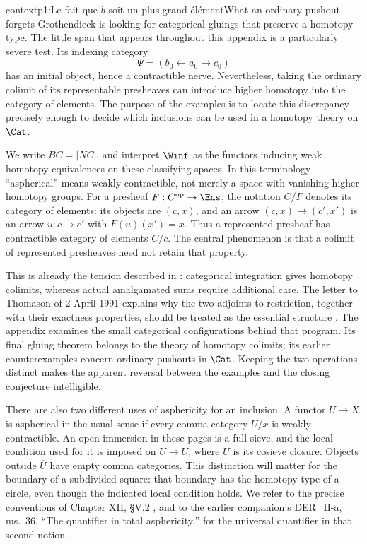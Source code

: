 \begin{dcomment}{context}{p1:Le fait que $b$ soit un plus grand élément}{What an ordinary pushout forgets}
Grothendieck is looking for categorical gluings that preserve a homotopy type. The little span that appears throughout this appendix is a particularly severe test. Its indexing category
\[
  \Psi=(b_0\longleftarrow a_0\longrightarrow c_0)
\]
has an initial object, hence a contractible nerve. Nevertheless, taking the ordinary colimit of its representable presheaves can introduce higher homotopy into the category of elements. The purpose of the examples is to locate this discrepancy precisely enough to decide which inclusions can be used in a homotopy theory on \(\Cat\).

We write \(BC=|NC|\), and interpret \(\Winf\) as the functors inducing weak homotopy equivalences on these classifying spaces. In this terminology ``aspherical'' means weakly contractible, not merely a space with vanishing higher homotopy groups. For a presheaf \(F:C^{\mathrm{op}}\to\Ens\), the notation \(C/F\) denotes its category of elements: its objects are \((c,x)\), and an arrow \((c,x)\to(c',x')\) is an arrow \(u:c\to c'\) with \(F(u)(x')=x\). Thus a represented presheaf has contractible category of elements \(C/c\). The central phenomenon is that a colimit of represented presheaves need not retain that property.

This is already the tension described in \citet[\S69]{Grothendieck1983}: categorical integration gives homotopy colimits, whereas actual amalgamated sums require additional care. The letter to Thomason of 2 April 1991 explains why the two adjoints to restriction, together with their exactness properties, should be treated as the essential structure \citep[pp.~8--9]{Grothendieck1991Letter}. The appendix examines the small categorical configurations behind that program. Its final gluing theorem belongs to the theory of homotopy colimits; its earlier counterexamples concern ordinary pushouts in \(\Cat\). Keeping the two operations distinct makes the apparent reversal between the examples and the closing conjecture intelligible.

There are also two different uses of asphericity for an inclusion. A functor \(U\to X\) is aspherical in the usual sense if every comma category \(U/x\) is weakly contractible. An open immersion in these pages is a full sieve, and the local condition used for it is imposed on \(U\to\overline U\), where \(\overline U\) is its cosieve closure. Objects outside \(\overline U\) have empty comma categories. This distinction will matter for the boundary of a subdivided square: that boundary has the homotopy type of a circle, even though the indicated local condition holds. We refer to the precise conventions of Chapter XII, \S V.2 \citep{Grothendieck1990XII}, and to the earlier companion's DER\_II-a, ms.~36, ``The quantifier in total asphericity,'' for the universal quantifier in that second notion.
\end{dcomment}

